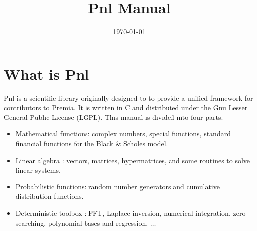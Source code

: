 \documentclass[a4paper,11pt,twoside]{article}
\title{Pnl Manual}
\date{\today}
\author{}
\begin{document}
\maketitle
\tableofcontents

\section{What is Pnl}

Pnl is a scientific library originally designed to to provide a unified
framework for contributors to Premia. It is written in C and distributed under
the Gnu Lesser General Public License (LGPL). This manual is divided into four
parts.
\begin{itemize}
\item Mathematical functions: complex numbers, special functions, standard
  financial functions for the Black \& Scholes model.
\item Linear algebra : vectors, matrices, hypermatrices, and some
  routines to solve linear systems.
\item Probabilistic functions: random number generators and  cumulative
  distribution functions.
\item Deterministic toolbox : FFT, Laplace inversion, numerical integration, zero searching,
  polynomial bases and regression, $\dots$
\end{itemize}











\printindex
\end{document}
